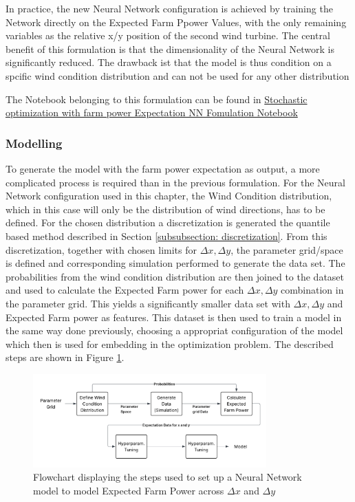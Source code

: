 \documentclass[preprint,12pt]{elsarticle}
\begin{document}
In practice, the new Neural Network configuration is achieved by training the Network directly on the Expected Farm Ppower Values, with the only remaining variables as the relative x/y position of the second wind turbine. The central benefit of this formulation is that the dimensionality of the Neural Network is significantly reduced. The drawback ist that the model is thus condition on a spcific wind condition distribution and can not be used for any other distribution


The Notebook belonging to this formulation can be found in \href{https://github.com/schmeti/uc3m_TFM_wind_farm_optimization_codebase/blob/main/Windfarm_power_modelling/0_two_turbine_problem_constrLearn_probweightedt_expNN.ipynb}{Stochastic optimization with farm power Expectation NN Fomulation Notebook} \cite{schmetz2025twoturbine_stoch2}

\subsubsection{Modelling}

To generate the model with the farm power expectation as output, a more complicated process is required than in the previous formulation. For the Neural Network configuration used in this chapter, the Wind Condition distribution, which in this case will only be the distribution of wind directions, has to be defined. For the chosen distribution a discretization is generated the quantile based method described in Section \ref{subsubsection: discretization}. From this discretization, together with chosen limits for \(\Delta x, \Delta y\), the parameter grid/space is defined and corresponding simulation performed to generate the data set. The probabilities from the wind condition distribution are then joined to the dataset and used to calculate the Expected Farm power for each \(\Delta x, \Delta y\) combination in the parameter grid. This yields a significantly smaller data set with \(\Delta x, \Delta y\) and Expected Farm power as features. This dataset is then used to train a model in the same way done previously, choosing a appropriat configuration of the model which then is used for embedding in the optimization problem. The described steps are shown in Figure \ref{fig:stoch2_model_flow}.


\begin{figure}[h] 
	\centering
	\includegraphics[width=0.8\textwidth]{../figures/optimization/stoch2/stoch2_model_flow.png} 
	\caption{Flowchart displaying the steps used to set up a Neural Network model to model Expected Farm Power across \(\Delta x\) and  \(\Delta y\)}
	\label{fig:stoch2_model_flow}
\end{figure} 
\end{document}
